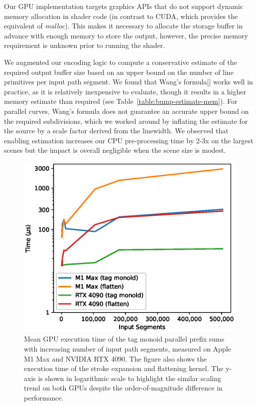 \documentclass[sigconf]{acmart}
\begin{document}
Our GPU implementation targets graphics APIs that do not support dynamic memory allocation in shader code (in contrast to CUDA, which provides the equivalent of \emph{malloc}). This makes it necessary to allocate the storage buffer in advance with enough memory to store the output, however, the precise memory requirement is unknown prior to running the shader.

We augmented our encoding logic to compute a conservative estimate of the required output buffer size based on an upper bound on the number of line primitives per input path segment. We found that Wang's formula[] works well in practice, as it is relatively inexpensive to evaluate, though it results in a higher memory estimate than required (see Table~\ref{table:bump-estimate-mem}). For parallel curves, Wang's formula does not guarantee an accurate upper bound on the required subdivisions, which we worked around by inflating the estimate for the source by a scale factor derived from the linewidth. We observed that enabling estimation increases our CPU pre-processing time by 2-3x on the largest scenes but the impact is overall negligible when the scene size is modest.

\begin{figure}
    \includegraphics[scale=0.66]{tag_monoid_gpu_timings}
    \caption{Mean GPU execution time of the tag monoid parallel prefix sums with increasing number of input path segments, measured on Apple M1 Max and NVIDIA RTX 4090. The figure also shows the execution time of the stroke expansion and flattening kernel. The y-axis is shown in logarithmic scale to highlight the similar scaling trend on both GPUs despite the order-of-magnitude difference in performance.}
    \label{fig:tag-monoid-gpu-timings}
\end{figure}
\end{document}

